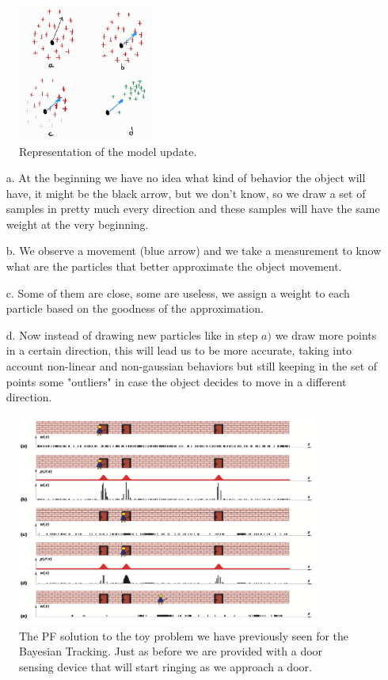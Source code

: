 \begin{figure}[H]
    \centering
    \includegraphics[width=0.4\textwidth]{Figures/pf.jpg}
    \caption{Representation of the model update.}
    \label{img:pf}
\end{figure}
\begin{itemize}
    \item[a.] At the beginning we have no idea what kind of behavior the object will have, it might be the black arrow, but we don't know, so we draw a set of samples in pretty much every direction and these samples will have the same weight at the very beginning.
    \item[b.] We observe a movement (blue arrow) and we take a measurement to know what are the particles that better approximate the object movement.
    \item[c.] Some of them are close, some are useless, we assign a weight to each particle based on the goodness of the approximation.
    \item[d.] Now instead of drawing new particles like in step $a)$ we draw more points in a certain direction, this will lead us to be more accurate, taking into account non-linear and non-gaussian behaviors but still keeping in the set of points some "outliers" in case the object decides to move in a different direction.
\end{itemize}


\begin{figure}[H]
    \centering
    \includegraphics[width=0.9\textwidth]{Figures/pftoy.png}
    \caption{The PF solution to the toy problem we have previously seen for the Bayesian Tracking. Just as before we are provided with a door sensing device that will start ringing as we approach a door.}
    \label{img:pftoy}
\end{figure}

